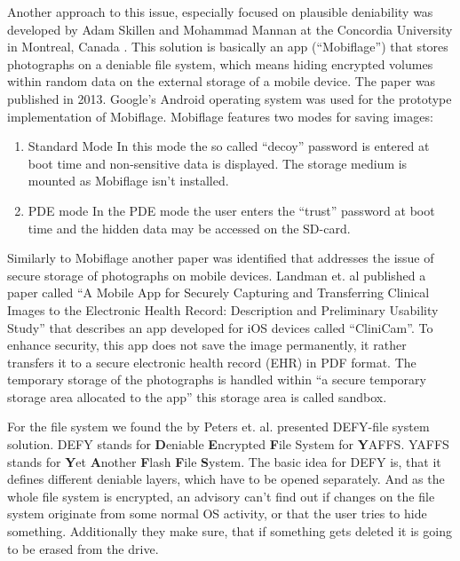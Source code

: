 \documentclass[12pt,a4paper,titlepage,oneside]{scrartcl}
\begin{document}
Another approach to this issue, especially focused on plausible deniability was developed by Adam Skillen and Mohammad Mannan at the Concordia University in Montreal, Canada \cite{skillen2013implementing}.
This solution is basically an app (``Mobiflage'') that stores photographs on a deniable file system, which means hiding encrypted volumes within random data on the external storage of a mobile device.
The paper was published in 2013.
Google's Android operating system was used for the prototype implementation of Mobiflage.
Mobiflage features two modes for saving images: 
\begin{enumerate}
  \item Standard Mode
  In this mode the so called ``decoy'' password is entered at boot time and non-sensitive data is displayed.
  The storage medium is mounted as Mobiflage isn't installed.
  \item PDE mode
  In the PDE mode the user enters the ``trust'' password at boot time and the hidden data may be accessed on the SD-card.
\end{enumerate}

Similarly to Mobiflage another paper was identified that addresses the issue of secure storage of photographs on mobile devices.
Landman et. al \cite{pmid25565678} published a paper called ``A Mobile App for Securely Capturing and Transferring Clinical Images to the Electronic Health Record: Description and Preliminary Usability Study'' that describes an app developed for iOS devices called ``CliniCam''.
To enhance security, this app does not save the image permanently, it rather transfers it to a secure electronic health record (EHR) in PDF format.
The temporary storage of the photographs is handled within ``a secure temporary storage area allocated to the app'' this storage area is called sandbox.

For the file system we found the by Peters et. al. presented DEFY-file system solution.
DEFY stands for \textbf{D}eniable \textbf{E}ncrypted \textbf{F}ile System for \textbf{Y}AFFS.
YAFFS stands for \textbf{Y}et \textbf{A}nother \textbf{F}lash \textbf{F}ile \textbf{S}ystem.
The basic idea for DEFY is, that it defines different deniable layers, which have to be opened separately.
And as the whole file system is encrypted, an advisory can't find out if changes on the file system originate from some normal OS activity, or that the user tries to hide something.
Additionally they make sure, that if something gets deleted it is going to be erased from the drive. \cite{peters2015defy}
\end{document}
